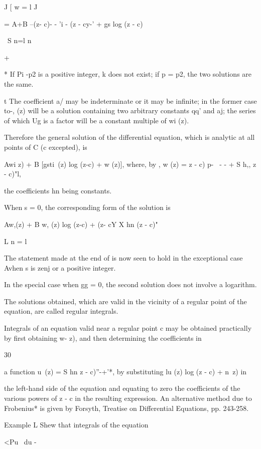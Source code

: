 J [ w = l J

= A+B --(z- c)- - 'i - (z - cy-' + gs log (z - c)

\ S n=l n

+ %

* If Pi -p2 is a positive integer, k does not exist; if p = p2, the
two solutions are the same.

t The coefficient a/ may be indeterminate or it may be infinite; in
the former case to-, (z) will be a solution containing two arbitrary
constants qq' and aj; the series of which Ug is a factor will be a
constant multiple of wi (z).

%
%

Therefore the general solution of the differential equation, which is
analytic at all points of C (c excepted), is

Awi z) + B [gsti\ (z) log (z-c) + w (z)], where, by , w (z) = z
- c) p- \ - - + S h,, z - c)"l,

the coefficients hn being constants.

When s = 0, the corresponding form of the solution is

Aw,(z) + B w, (z) log (z-c) + (z- cY X hn (z - c)"

L n = l \

The statement made at the end of  is now seen to hold in the
exceptional case Avhen s is zenj or a positive integer.

In the special case when gg = 0, the second solution does not involve
a logarithm.

The solutions obtained, which are valid in the vicinity of a regular
point of the equation, are called regular integrals.

Integrals of an equation valid near a regular point c may be obtained
practically by first obtaining w- z), and then determining the
coefficients in

30

a function u\ (z) = S hn z - c)''-+'*, by substituting lu (z) log (z -
c) + n\ z) in

the left-hand side of the equation and equating to zero the
coefficients of the various powers of z - c in the resulting
expression. An alternative method due to Frobenius* is given by
Forsyth, Treatise on Differential Equations, pp. 243-258.

Example L Shew that integrals of the equation

<Pu \ du -

